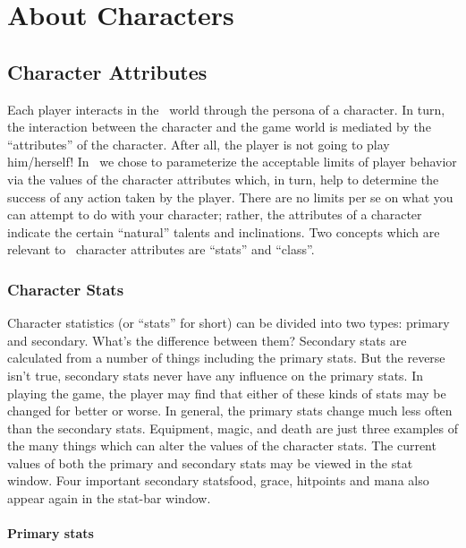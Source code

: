 
\chapter{About Characters}

\section{Character Attributes}\label{sec:char_attr}
 
Each player interacts in the \cf\ world through the persona of a 
character. In turn, the interaction between the character and 
the game world is mediated by the ``attributes'' of the character. 
After all, the player is not going to play him/herself! In \cf\ we 
chose to parameterize the acceptable limits of player behavior 
via the values of the character attributes which, in turn, help
to determine the success of any action taken by the player. There 
are no limits per se on what you can attempt to 
do with your character; rather, the attributes of a character 
indicate the certain ``natural'' talents and inclinations.  
Two concepts which are relevant to \cf\ character attributes are 
``stats'' and ``class''.

\subsection{Character Stats}

Character statistics (or ``stats'' for short) can be 
divided into two types: primary and secondary. What's the difference 
between them? Secondary stats are calculated from a number of things
including the primary stats. But the reverse isn't true, secondary 
stats never have any influence on the primary stats. In playing the game, the 
player may find that either of these kinds of stats may be changed 
for better or worse. In general, the primary stats change much less 
often than the secondary stats. Equipment, magic, and death are 
just three examples of the many things which can alter the values of 
the character stats. The current values of both the primary and 
secondary stats may be viewed in the stat window. Four important
secondary stats\emdash food, grace, hitpoints and mana also appear 
again in the stat-bar window. 


\subsubsection{Primary stats}

